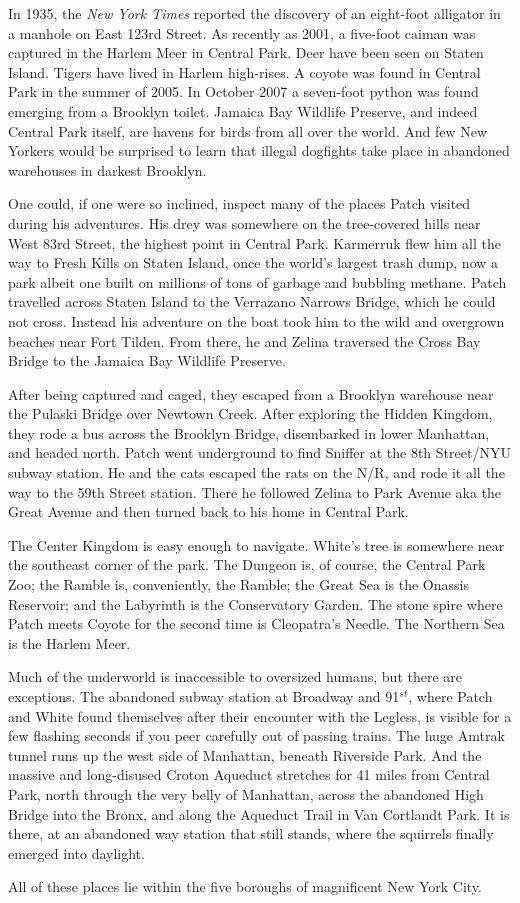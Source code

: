 \documentclass[12pt]{book}
\begin{document}
In 1935, the {\it New York Times} reported the discovery of an eight-foot alligator in a manhole on East 123rd Street. As recently as 2001, a five-foot caiman was captured in the Harlem Meer in Central Park. Deer have been seen on Staten Island. Tigers have lived in Harlem high-rises. A coyote was found in Central Park in the summer of 2005. In October 2007 a seven-foot python was found emerging from a Brooklyn toilet. Jamaica Bay Wildlife Preserve, and indeed Central Park itself, are havens for birds from all over the world. And few New Yorkers would be surprised to learn that illegal dogfights take place in abandoned warehouses in darkest Brooklyn.\par
One could, if one were so inclined, inspect many of the places Patch visited during his adventures. His drey was somewhere on the tree-covered hills near West 83rd Street, the highest point in Central Park. Karmerruk flew him all the way to Fresh Kills on Staten Island, once the world's largest trash dump, now a park %
 albeit one built on millions of tons of garbage and bubbling methane. Patch travelled across Staten Island to the Verrazano Narrows Bridge, which he could not cross. Instead his adventure on the boat took him to the wild and overgrown beaches near Fort Tilden. From there, he and Zelina traversed the Cross Bay Bridge to the Jamaica Bay Wildlife Preserve.\par
After being captured and caged, they escaped from a Brooklyn warehouse near the Pulaski Bridge over Newtown Creek. After exploring the Hidden Kingdom, they rode a bus across the Brooklyn Bridge, disembarked in lower Manhattan, and headed north. Patch went underground to find Sniffer at the 8th Street/NYU subway station. He and the cats escaped the rats on the N/R, and rode it all the way to the 59th Street station. There he followed Zelina to Park Avenue %
 aka the Great Avenue %
 and then turned back to his home in Central Park.\par
The Center Kingdom is easy enough to navigate. White's tree is somewhere near the southeast corner of the park. The Dungeon is, of course, the Central Park Zoo; the Ramble is, conveniently, the Ramble; the Great Sea is the Onassis Reservoir; and the Labyrinth is the Conservatory Garden. The stone spire where Patch meets Coyote for the second time is Cleopatra's Needle. The Northern Sea is the Harlem Meer.\par
Much of the underworld is inaccessible to oversized humans, but there are exceptions. The abandoned subway station at Broadway and 91$^{st}$, where Patch and White found themselves after their encounter with the Legless, is visible for a few flashing seconds if you peer carefully out of passing trains. The huge Amtrak tunnel runs up the west side of Manhattan, beneath Riverside Park. And the massive and long-disused Croton Aqueduct stretches for 41 miles from Central Park, north through the very belly of Manhattan, across the abandoned High Bridge into the Bronx, and along the Aqueduct Trail in Van Cortlandt Park. It is there, at an abandoned way station that still stands, where the squirrels finally emerged into daylight.\par
All of these places lie within the five boroughs of magnificent New York City.\par
\par
{}
\par
\par
\par
\end{document}
